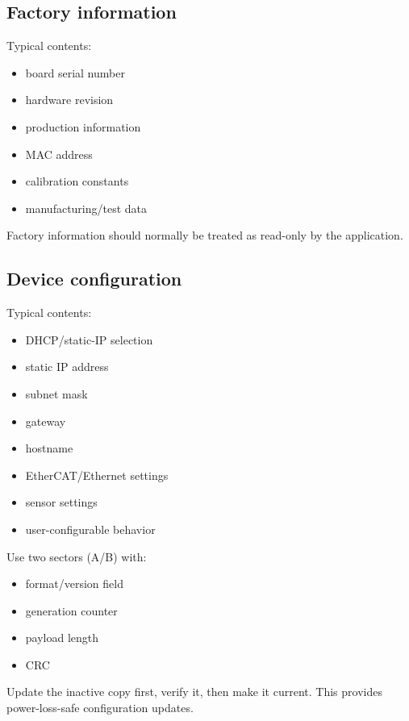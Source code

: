 \documentclass[10pt,a4paper,oneside]{report}
\providecommand{\tightlist}{\setlength{\itemsep}{1pt}\setlength{\parskip}{1pt}}
\begin{document}
\subsection{Factory information}\label{wiki-reference-flash-layout-proposal--factory-information}

Typical contents:

\begin{itemize}
\tightlist
\item
  board serial number
\item
  hardware revision
\item
  production information
\item
  MAC address
\item
  calibration constants
\item
  manufacturing/test data
\end{itemize}

Factory information should normally be treated as read-only by the application.

\subsection{Device configuration}\label{wiki-reference-flash-layout-proposal--device-configuration}

Typical contents:

\begin{itemize}
\tightlist
\item
  DHCP/static-IP selection
\item
  static IP address
\item
  subnet mask
\item
  gateway
\item
  hostname
\item
  EtherCAT/Ethernet settings
\item
  sensor settings
\item
  user-configurable behavior
\end{itemize}

Use two sectors (A/B) with:

\begin{itemize}
\tightlist
\item
  format/version field
\item
  generation counter
\item
  payload length
\item
  CRC
\end{itemize}

Update the inactive copy first, verify it, then make it current. This provides power-loss-safe configuration updates.
\end{document}
